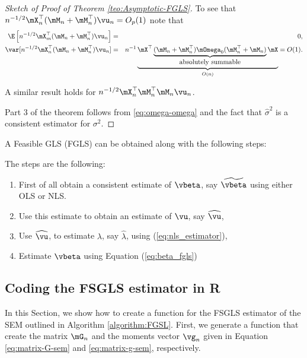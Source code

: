 \begin{proof}[Sketch of Proof of Theorem \ref{teo:Asymptotic-FGLS}]
To see that $n^{-1/2}\mX^\top_n(\mM_n + \mM^\top_n)\vu_n = O_p(1)$ note that
\begin{eqnarray*}
\E\left[n^{-1/2}\mX^\top_m(\mM_n + \mM^\top_n)\vu_n\right] &=& 0, \\
\var[n^{-1/2}\mX^\top_n(\mM_n + \mM^\top_n)\vu_n] &=& n^{-1}\underbrace{\mX^\top\underbrace{(\mM_n + \mM^\top_n)\mOmega_0(\mM^\top_n + \mM_n)}_{\mbox{absolutely summable}}\mX}_{O(n)} = O(1).
\end{eqnarray*}

A similar result holds for $n^{-1/2}\mX^\top_n\mM^\top_n\mM_n\vu_n$.

Part 3 of the theorem follows from \eqref{eq:omega-omega} and the fact that $\widehat{\sigma}^2$ is a consistent estimator for $\sigma^2$.
\end{proof}


A Feasible GLS (FGLS) can be obtained along with the following steps:

\begin{algorithm}\label{algorithm:FGSL}
The steps are the following:

\begin{enumerate}
  \item First of all obtain a consistent estimate of $\vbeta$, say $\widetilde{\vbeta}$ using either OLS or NLS.
  \item Use this estimate to obtain an estimate of $\vu$, say $\widehat{\vu}$,
  \item Use $\widehat{\vu}$, to estimate $\lambda$, say $\widehat{\lambda}$, using (\ref{eq:nls_estimator}),
  \item Estimate $\vbeta$ using Equation (\ref{eq:beta_fgls})
\end{enumerate}
\end{algorithm}


\subsection{Coding the FSGLS estimator in R}

In this Section, we show how to create a function for the FSGLS estimator of the SEM outlined in Algorithm \ref{algorithm:FGSL}. First, we generate a function that create the matrix $\mG_n$ and the moments vector $\vg_n$ given in Equation \eqref{eq:matrix-G-sem} and \eqref{eq:matrix-g-sem}, respectively. 

